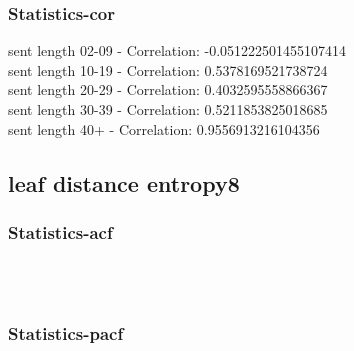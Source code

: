 \documentclass{article}%
\begin{document}
%
\newpage%
\subsubsection{Statistics{-}cor}%
\label{ssubsec:Statistics{-}cor}%
\noindent%
sent length 02-09 - Correlation: -0.051222501455107414\\%
sent length 10-19 - Correlation: 0.5378169521738724\\%
sent length 20-29 - Correlation: 0.4032595558866367\\%
sent length 30-39 - Correlation: 0.5211853825018685\\%
sent length 40+ - Correlation: 0.9556913216104356\\

%
\newpage

%
\subsection{leaf distance entropy8}%
\label{subsec:leafdistanceentropy8}%
\subsubsection{Statistics{-}acf}%
\label{ssubsec:Statistics{-}acf}%


\begin{figure}[ht]%
\centering%
\setlength{\abovecaptionskip}{-35pt}%
%
%
\\%
%
%
\\%
%
\end{figure}

%
\newpage%
\subsubsection{Statistics{-}pacf}%
\label{ssubsec:Statistics{-}pacf}%
\end{document}
